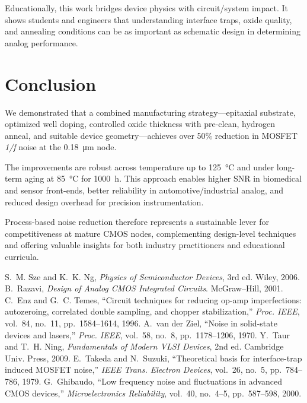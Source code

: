 \documentclass[conference]{IEEEtran}
\begin{document}
Educationally, this work bridges device physics with circuit/system impact. It shows students and engineers that understanding interface traps, oxide quality, and annealing conditions can be as important as schematic design in determining analog performance.

\section{Conclusion}
We demonstrated that a combined manufacturing strategy---epitaxial substrate, optimized well doping, controlled oxide thickness with pre-clean, hydrogen anneal, and suitable device geometry---achieves over 50\% reduction in MOSFET \emph{1/f} noise at the \SI{0.18}{\um} node. 

The improvements are robust across temperature up to \SI{125}{\celsius} and under long-term aging at \SI{85}{\celsius} for 1000~h. This approach enables higher SNR in biomedical and sensor front-ends, better reliability in automotive/industrial analog, and reduced design overhead for precision instrumentation. 

Process-based noise reduction therefore represents a sustainable lever for competitiveness at mature CMOS nodes, complementing design-level techniques and offering valuable insights for both industry practitioners and educational curricula.

\begin{thebibliography}{10}
S.~M. Sze and K.~K. Ng, \emph{Physics of Semiconductor Devices}, 3rd ed. Wiley, 2006.
B.~Razavi, \emph{Design of Analog CMOS Integrated Circuits}. McGraw--Hill, 2001.
C.~Enz and G.~C. Temes, ``Circuit techniques for reducing op-amp imperfections: autozeroing, correlated double sampling, and chopper stabilization,'' \emph{Proc. IEEE}, vol.~84, no.~11, pp.~1584--1614, 1996.
A.~van der Ziel, ``Noise in solid-state devices and lasers,'' \emph{Proc. IEEE}, vol.~58, no.~8, pp.~1178--1206, 1970.
Y.~Taur and T.~H. Ning, \emph{Fundamentals of Modern VLSI Devices}, 2nd ed. Cambridge Univ. Press, 2009.
E.~Takeda and N.~Suzuki, ``Theoretical basis for interface-trap induced MOSFET noise,'' \emph{IEEE Trans. Electron Devices}, vol.~26, no.~5, pp.~784--786, 1979.
G.~Ghibaudo, ``Low frequency noise and fluctuations in advanced CMOS devices,'' \emph{Microelectronics Reliability}, vol.~40, no.~4--5, pp.~587--598, 2000.
\end{thebibliography}
\end{document}
